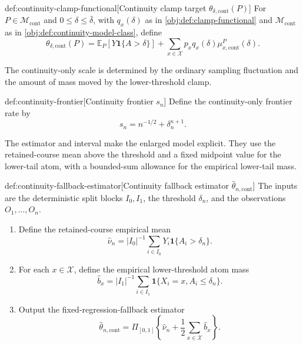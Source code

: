 \documentclass[11pt]{article}
\begin{document}
\begin{definitionv}{def:continuity-clamp-functional}[Continuity clamp target \(\theta_{\delta,\mathrm{cont}}(P)\)]
For \(P\in\mathcal M_{\mathrm{cont}}\) and \(0\leq\delta\leq\bar\delta\), with \(q_x(\delta)\) as in \cref{obj:def:clamp-functional} and \(\mathcal M_{\mathrm{cont}}\) as in \cref{obj:def:continuity-model-class}, define
\[
 \theta_{\delta,\mathrm{cont}}(P)
 =
 \mathbb E_P\!\left[Y\mathbf 1\{A>\delta\}\right]
 +
 \sum_{x\in\mathcal X}
 p_xq_x(\delta)\mu_{x,\mathrm{cont}}^P(\delta).
\]
\end{definitionv}

The continuity-only scale is determined by the ordinary sampling fluctuation and the amount of mass moved by the lower-threshold clamp.

\begin{definitionv}{def:continuity-frontier}[Continuity frontier \(s_n\)]
Define the continuity-only frontier rate by
\[
s_n=n^{-1/2}+\delta_n^{\kappa+1}.
\]
\end{definitionv}

The estimator and interval make the enlarged model explicit. They use the retained-course mean above the threshold and a fixed midpoint value for the lower-tail atom, with a bounded-sum allowance for the empirical lower-tail mass.

\begin{algorithmv}{def:continuity-fallback-estimator}[Continuity fallback estimator \(\widehat\theta_{n,\mathrm{cont}}\)]
The inputs are the deterministic split blocks \(I_0,I_1\), the threshold \(\delta_n\), and the observations \(O_1,\ldots,O_n\).
\begin{enumerate}
\item Define the retained-course empirical mean
\[
\widehat\nu_n
=
|I_0|^{-1}\sum_{i\in I_0}Y_i\mathbf 1\{A_i>\delta_n\}.
\]
\item For each \(x\in\mathcal X\), define the empirical lower-threshold atom mass
\[
\widehat b_x
=
|I_1|^{-1}\sum_{i\in I_1}\mathbf 1\{X_i=x,A_i\leq\delta_n\}.
\]
\item Output the fixed-regression-fallback estimator
\[
\widehat\theta_{n,\mathrm{cont}}
=
\Pi_{[0,1]}\left\{\widehat\nu_n+\frac12\sum_{x\in\mathcal X}\widehat b_x\right\}.
\]
\end{enumerate}
\end{algorithmv}
\end{document}
